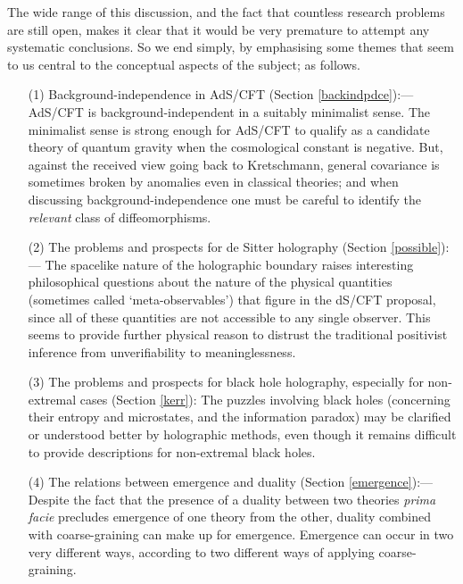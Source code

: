 \documentclass[12pt]{article}
\renewcommand{\^}[1]{\hat{#1}}
\begin{document}
The wide range of this discussion, and the fact that countless research problems are still open, makes it clear that it would be very premature to attempt any systematic conclusions. So we end simply, by emphasising some themes that seem to us central to the conceptual aspects of the subject; as follows.
\begin{itemize}
\item[(1)] Background-independence in AdS/CFT (Section \ref{backindpdce}):--- AdS/CFT is background-independent in a suitably minimalist sense. The minimalist sense is strong enough for AdS/CFT to qualify as a candidate theory of quantum gravity when the cosmological constant is negative. But, against the received view going back to Kretschmann, general covariance is sometimes broken by anomalies even in classical theories; and when discussing background-independence one must be careful to identify the {\it relevant} class of diffeomorphisms.
\item[(2)] The problems and prospects for de Sitter holography (Section \ref{possible}):--- The spacelike nature of the holographic boundary raises interesting philosophical questions about the nature of the physical quantities  (sometimes called `meta-observables') that figure in the dS/CFT proposal, since all of these quantities are not accessible to any single observer. This seems to provide further physical reason to distrust the traditional positivist inference from  unverifiability to meaninglessness. 
\item[(3)] The problems and prospects for black hole holography, especially for non-extremal cases (Section \ref{kerr}): The puzzles involving black holes (concerning their entropy and microstates, and the information paradox) may be clarified or understood better by holographic methods, even though it remains difficult to provide descriptions for non-extremal black holes.
\item[(4)] The relations between emergence and duality (Section \ref{emergence}):--- Despite the fact that the presence of a duality between two theories {\it prima facie} precludes emergence of one theory from the other, duality combined with coarse-graining can make up for emergence. Emergence can occur in two very different  ways, according to two different ways of applying coarse-graining.
\end{itemize}

\end{document}

